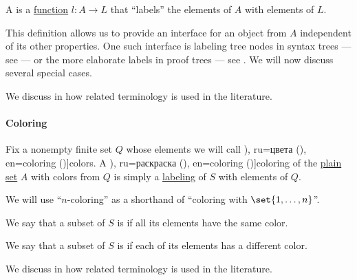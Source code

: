 \begin{definition}\label{def:labeled_set}\mimprovised
  A  is a \hyperref[def:function]{function} \( l: A \to L \) that \enquote{labels} the elements of \( A \) with elements of \( L \).
\end{definition}
\begin{comments}
  \item This definition allows us to provide an interface for an object from \( A \) independent of its other properties. One such interface is labeling tree nodes in syntax trees --- see  --- or the more elaborate labels in proof trees --- see . We will now discuss several special cases.

  \item We discuss in  how related terminology is used in the literature.
\end{comments}

\paragraph{Coloring}

\begin{definition}\label{def:set_coloring}\mimprovised
  Fix a nonempty finite set \( Q \) whose elements we will call \term[bg=цветове (\cite[141]{Мирчев2001}), ru=цвета (\cite[.1]{Новиков2013}), en=coloring (\cite[111]{Diestel2005})]{colors}. A \term[bg=оцветяване (\cite[141]{Мирчев2001}), ru=раскраска (\cite[.1]{Новиков2013}), en=coloring (\cite[111]{Diestel2005})]{coloring} of the \hyperref[def:plain_set]{plain set} \( A \) with colors from \( Q \) is simply a \hyperref[def:labeled_set]{labeling} of \( S \) with elements of \( Q \).

  We will use \enquote{\( n \)-coloring} as a shorthand of \enquote{coloring with \( \set{ 1, \ldots, n } \)}.

  \begin{thmenum}
     We say that a subset of \( S \) is  if all its elements have the same color.

     We say that a subset of \( S \) is  if each of its elements has a different color.
  \end{thmenum}
\end{definition}
\begin{comments}
  \item We discuss in  how related terminology is used in the literature.
\end{comments}

